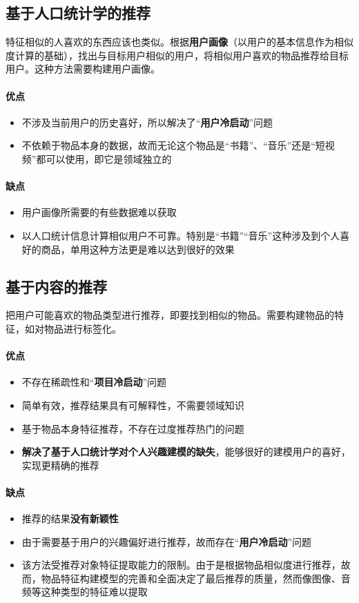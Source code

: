 \subsection{基于人口统计学的推荐}
特征相似的人喜欢的东西应该也类似。根据\textbf{用户画像}（以用户的基本信息作为相似度计算的基础），找出与目标用户相似的用户，将相似用户喜欢的物品推荐给目标用户。这种方法需要构建用户画像。
\paragraph{优点}
\begin{itemize}
	\item 不涉及当前用户的历史喜好，所以解决了“\textbf{用户冷启动}”问题
	\item 不依赖于物品本身的数据，故而无论这个物品是“书籍”、“音乐”还是“短视频”都可以使用，即它是领域独立的
\end{itemize}

\paragraph{缺点}
\begin{itemize}
	\item 用户画像所需要的有些数据难以获取
	\item 以人口统计信息计算相似用户不可靠。特别是“书籍”“音乐”这种涉及到个人喜好的商品，单用这种方法更是难以达到很好的效果
\end{itemize}

\subsection{基于内容的推荐}
把用户可能喜欢的物品类型进行推荐，即要找到相似的物品。需要构建物品的特征，如对物品进行标签化。
\paragraph{优点}
\begin{itemize}
	\item 不存在稀疏性和“\textbf{项目冷启动}”问题
	\item 简单有效，推荐结果具有可解释性，不需要领域知识
	\item 基于物品本身特征推荐，不存在过度推荐热门的问题
	\item \textbf{解决了基于人口统计学对个人兴趣建模的缺失}，能够很好的建模用户的喜好，实现更精确的推荐
\end{itemize}

\paragraph{缺点}
\begin{itemize}
	\item 推荐的结果\textbf{没有新颖性}
	\item 由于需要基于用户的兴趣偏好进行推荐，故而存在“\textbf{用户冷启动}”问题
	\item 该方法受推荐对象特征提取能力的限制。由于是根据物品相似度进行推荐，故而，物品特征构建模型的完善和全面决定了最后推荐的质量，然而像图像、音频等这种类型的特征难以提取
\end{itemize}

